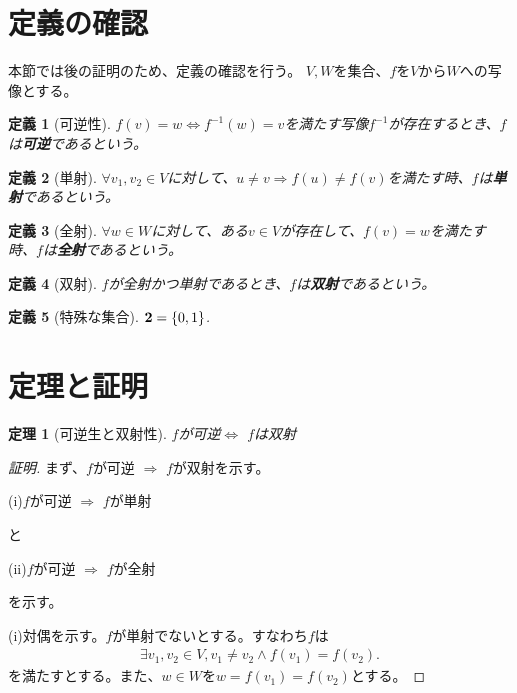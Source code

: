 \documentclass{jsarticle}
\newtheorem{Theorem}{定理}
\newtheorem{Definition}{定義}
\begin{document}
\section{定義の確認}
本節では後の証明のため、定義の確認を行う。
$V,W$を集合、$f$を$V$から$W$への写像とする。
\begin{Definition}[可逆性]
    $f(v)=w \Leftrightarrow f^{-1}(w)=v$を満たす写像$f^{-1}$が存在するとき、$f$は{\bf 可逆}であるという。
\end{Definition}

\begin{Definition}[単射]
    $\forall v_1,v_2 \in V$に対して、$u \neq v \Rightarrow f(u) \neq f(v)$を満たす時、$f$は{\bf 単射}であるという。
\end{Definition}

\begin{Definition}[全射]
    $\forall w \in W$に対して、ある$v \in V$が存在して、$f(v)=w$を満たす時、$f$は{\bf 全射}であるという。
\end{Definition}

\begin{Definition}[双射]
    $f$が全射かつ単射であるとき、$f$は{\bf 双射}であるという。
\end{Definition}

\begin{Definition}[特殊な集合]
    ${\bf 2} = \{0,1\}$.
\end{Definition}

\section{定理と証明}
\begin{Theorem}[可逆生と双射性]
    $f$が可逆$\Leftrightarrow$ $f$は双射
\end{Theorem}
\begin{proof}[証明]
    まず、$f$が可逆 $\Rightarrow$ $f$が双射を示す。

    (i)$f$が可逆 $\Rightarrow$ $f$が単射

    と

    (ii)$f$が可逆 $\Rightarrow$ $f$が全射

    を示す。

    (i)対偶を示す。$f$が単射でないとする。すなわち$f$は
    \begin{align}
        \exists v_1, v_2 \in V, v_1 \neq v_2 \land f(v_1)=f(v_2).
    \end{align}
    を満たすとする。また、$w \in W$を$w = f(v_1)=f(v_2)$とする。
\end{proof}
\end{document}
